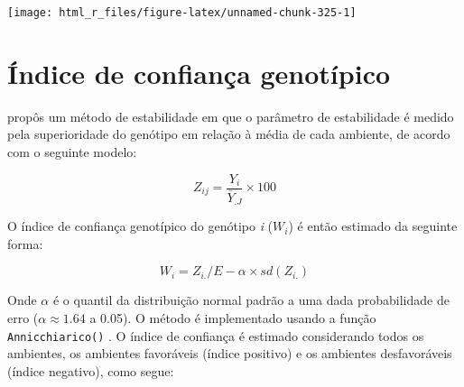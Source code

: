 \documentclass[
]{book}
\newenvironment{Shaded}{\begin{snugshade}}{\end{snugshade}}
\newcommand{\CommentTok}[1]{\textcolor[rgb]{0.56,0.35,0.01}{\textit{#1}}}
\newcommand{\KeywordTok}[1]{\textcolor[rgb]{0.13,0.29,0.53}{\textbf{#1}}}
\newcommand{\NormalTok}[1]{#1}
\newcommand{\OperatorTok}[1]{\textcolor[rgb]{0.81,0.36,0.00}{\textbf{#1}}}
\begin{document}
\begin{Shaded}
\end{Shaded}

\begin{center}\texttt{[image: html\_r\_files/figure-latex/unnamed-chunk-325-1]} \end{center}

\hypertarget{uxedndice-de-confianuxe7a-genotuxedpico}{%
\section{Índice de confiança genotípico}\label{uxedndice-de-confianuxe7a-genotuxedpico}}

\citet{Annicchiarico1992} propôs um método de estabilidade em que o parâmetro de estabilidade é medido pela superioridade do genótipo em relação à média de cada ambiente, de acordo com o seguinte modelo:

\[
{Z_ {ij}} = \frac{{{Y_ {i}}}} {{{{\bar Y} _ {. J}}}} \times 100
\]

O índice de confiança genotípico do genótipo \emph{i} (\(W_i\)) é então estimado da seguinte forma:

\[
W_i = Z_{i.} / E - \alpha \times sd (Z_{i.})
\]

Onde \(\alpha\) é o quantil da distribuição normal padrão a uma dada probabilidade de erro (\(\alpha \approx 1.64\) a 0.05). O método é implementado usando a função \texttt{Annicchiarico()} . O índice de confiança é estimado considerando todos os ambientes, os ambientes favoráveis (índice positivo) e os ambientes desfavoráveis (índice negativo), como segue:
\end{document}
